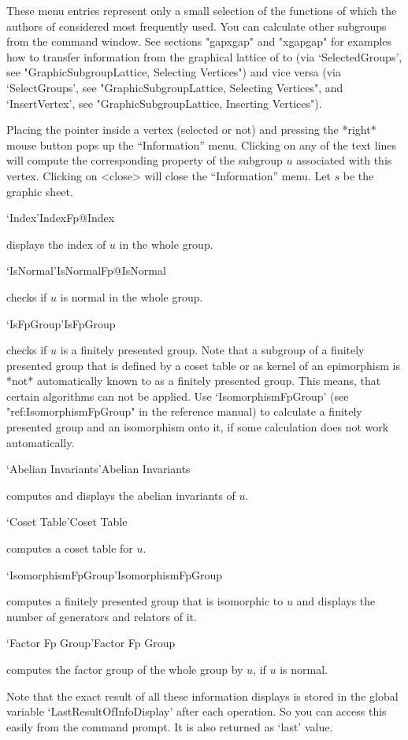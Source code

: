 \bigskip

These menu entries represent only a small selection of the functions of
{\GAP} which the authors of {\XGAP} considered most frequently used. You
can calculate other subgroups from
the {\GAP} command window. See sections "gapxgap" and
"xgapgap" for examples how to transfer information from the graphical
lattice of {\XGAP} to {\GAP} (via `SelectedGroups', see
"GraphicSubgroupLattice, Selecting Vertices") and vice versa (via
`SelectGroups', see "GraphicSubgroupLattice, Selecting Vertices", and
`InsertVertex', see "GraphicSubgroupLattice, Inserting Vertices").



Placing the pointer  inside a vertex (selected  or not) and  pressing the
*right* mouse button pops up the ``Information''  menu.  Clicking on any of
the text  lines will compute the corresponding   property of the subgroup
$u$  associated  with this  vertex. Clicking  on <close>  will  close the
``Information'' menu.  Let $s$ be the graphic sheet.

\>`Index'{IndexFp}@{Index}

displays  the index of  $u$ in the whole  group.

\>`IsNormal'{IsNormalFp}@{IsNormal}

checks  if $u$ is  normal  in the  whole group.

\>`IsFpGroup'{IsFpGroup}

checks if $u$ is a finitely presented group. Note that a subgroup of a
finitely presented group that is defined by a coset table or as kernel
of an epimorphism is *not* automatically known to {\GAP} as a finitely
presented group. This means, that certain algorithms can not be
applied. Use `IsomorphismFpGroup' (see "ref:IsomorphismFpGroup" in the
{\GAP} reference manual) to calculate a finitely presented group and
an isomorphism onto it, if some calculation does not work automatically.

\>`Abelian Invariants'{Abelian Invariants}

computes  and  displays  the  abelian invariants  of  $u$.

\>`Coset Table'{Coset Table}

computes   a   coset table for   $u$.

\>`IsomorphismFpGroup'{IsomorphismFpGroup}

computes a finitely presented group that is isomorphic to $u$ and displays
the number of generators and relators of it.

\>`Factor Fp Group'{Factor Fp Group}

computes the factor group  of the whole group by $u$, if $u$ is normal.

\bigskip

Note that the exact result of all these information displays is stored in
the global variable `LastResultOfInfoDisplay' after each operation. So you
can access this easily from the {\GAP} command prompt. It is also returned
as `last' value.


